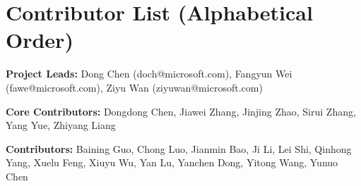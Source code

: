 \section*{Contributor List (Alphabetical Order)}
\label{sec:contributor}

\noindent\textbf{Project Leads:} Dong Chen (doch@microsoft.com), Fangyun Wei (fawe@microsoft.com), Ziyu Wan (ziyuwan@microsoft.com)


\noindent\textbf{Core Contributors:} Dongdong Chen, Jiawei Zhang, Jinjing Zhao, Sirui Zhang, Yang Yue, Zhiyang Liang


\noindent\textbf{Contributors:} Baining Guo, Chong Luo, Jianmin Bao, Ji Li, Lei Shi, Qinhong Yang, Xuelu Feng, Xiuyu Wu, Yan Lu, Yanchen Dong, Yitong Wang, Yunuo Chen



